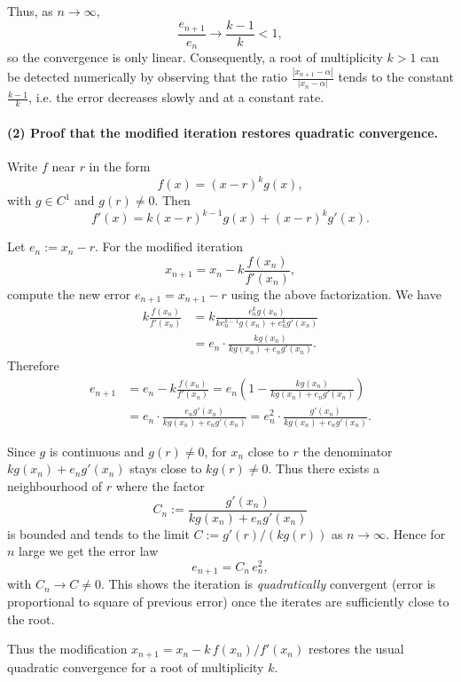 \documentclass[a4paper]{article}
\begin{document}
Thus, as \( n \to \infty \),
\[
\frac{e_{n+1}}{e_n} \to \frac{k-1}{k} < 1,
\]
so the convergence is only linear.  
Consequently, a root of multiplicity \( k > 1 \) can be detected numerically by observing that the ratio \( \frac{|x_{n+1} - \alpha|}{|x_n - \alpha|} \) tends to the constant \( \frac{k-1}{k} \), i.e. the error decreases slowly and at a constant rate.



\paragraph{(2) Proof that the modified iteration restores quadratic convergence.}


Write $f$ near $r$ in the form
\[
f(x) = (x-r)^k g(x),
\]
with $g\in C^1$ and $g(r)\neq0$. Then
\[
f'(x) = k(x-r)^{k-1} g(x) + (x-r)^k g'(x).
\]

Let $e_n:=x_n-r$. For the modified iteration
\[
x_{n+1} = x_n - k\frac{f(x_n)}{f'(x_n)},
\]
compute the new error $e_{n+1}=x_{n+1}-r$ using the above factorization.
We have
\[
\begin{aligned}
k\frac{f(x_n)}{f'(x_n)}
&= k\frac{e_n^k g(x_n)}{k e_n^{k-1} g(x_n) + e_n^k g'(x_n)} \\
&= e_n\cdot\frac{k g(x_n)}{k g(x_n) + e_n g'(x_n)}.
\end{aligned}
\]
Therefore
\[
\begin{aligned}
e_{n+1}
&= e_n - k\frac{f(x_n)}{f'(x_n)}
= e_n\left(1 - \frac{k g(x_n)}{k g(x_n) + e_n g'(x_n)}\right)\\[4pt]
&= e_n\cdot\frac{e_n g'(x_n)}{k g(x_n) + e_n g'(x_n)}
= e_n^2\cdot\frac{g'(x_n)}{k g(x_n) + e_n g'(x_n)}.
\end{aligned}
\]

Since $g$ is continuous and $g(r)\neq0$, for $x_n$ close to $r$ the
denominator $k g(x_n)+e_n g'(x_n)$ stays close to $k g(r)\neq0$. Thus
there exists a neighbourhood of $r$ where the factor
\[
C_n:=\frac{g'(x_n)}{k g(x_n) + e_n g'(x_n)}
\]
is bounded and tends to the limit $C:=g'(r)/(k g(r))$ as $n\to\infty$.
Hence for $n$ large we get the error law
\[
e_{n+1} = C_n\, e_n^2,
\]
with $C_n\to C\neq0$. This shows the iteration is \emph{quadratically}
convergent (error is proportional to square of previous error) once the
iterates are sufficiently close to the root.

Thus the modification $x_{n+1}=x_n-k\,f(x_n)/f'(x_n)$ restores the usual
quadratic convergence for a root of multiplicity $k$.
\end{document}

